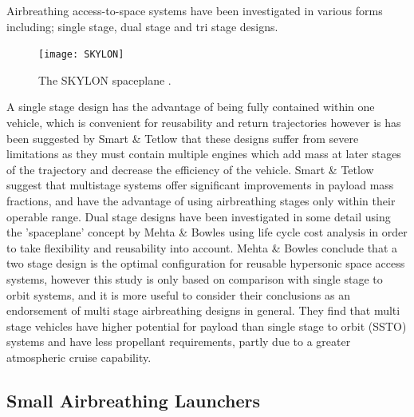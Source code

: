 Airbreathing access-to-space systems have been investigated in various forms including; single stage\cite{Powell1991,Wilhite1991,Varvill2008,Trefny1999,Roche2000,Young2006,Bradford2000}, dual stage \cite{Tsuchiya2005,Mehta2001,Gong2014} and tri stage \cite{Preller2017} designs. 
  \begin{figure}[ht]
  	\centering
  	\texttt{[image: SKYLON]}
  	\caption{The SKYLON spaceplane \cite{Varvill2008}.}
  	\label{fig:SKYLON}
  \end{figure}
  A single stage design has the advantage of being fully contained within one vehicle, which is convenient for reusability and return trajectories however is has been suggested by Smart \& Tetlow \cite{Smart2009} that these designs suffer from severe limitations as they must contain multiple engines which add mass at later stages of the trajectory and decrease the efficiency of the vehicle. Smart \& Tetlow suggest that multistage systems offer significant improvements in payload mass fractions, and have the advantage of using airbreathing stages only within their operable range.
  Dual stage designs have been investigated in some detail using the 'spaceplane' concept by Mehta \& Bowles \cite{Mehta2001} using life cycle cost analysis in order to take flexibility and reusability into account. Mehta \& Bowles conclude that a two stage design is the optimal configuration for reusable hypersonic space access systems, however this study is only based on comparison with single stage to orbit systems, and it is more useful to consider their conclusions as an endorsement of multi stage airbreathing designs in general. They find that multi stage vehicles have higher potential for payload than single stage to orbit (SSTO) systems and have less propellant requirements, partly due to a greater atmospheric cruise capability. 
 
  

\subsection{Small Airbreathing Launchers}

